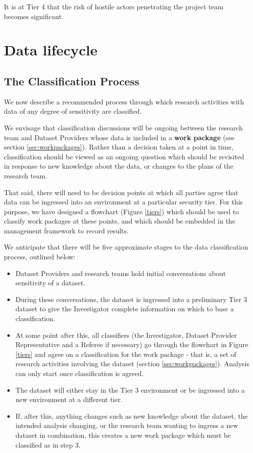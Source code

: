 \documentclass[10pt,a4paper,twocolumn]{article}
\begin{document}
It is at Tier 4 that the risk of hostile actors penetrating the project team becomes significant.

\section{Data lifecycle}

\subsection{The Classification Process}
\label{sec:classification}

We now describe a recommended process through which research activities with data of any degree of sensitivity are classified. 

We envisage that classification discussions will be ongoing between the research team and Dataset Providers whose data is included in a \textbf{work package} (see section \ref{sec:workpackages}). Rather than a decision taken at a point in time, classification should be viewed as an ongoing question which should be revisited in response to new knowledge about the data, or changes to the plans of the research team.

That said, there will need to be decision points at which all parties agree that data can be ingressed into an environment at a particular security tier. For this purpose, we have designed a flowchart (Figure \ref{tiers}) which should be used to classify work packages at these points, and which should be embedded in the management framework to record results.

We anticipate that there will be five approximate stages to the data classification process, outlined below:

\begin{itemize}
    \item Dataset Providers and research teams hold initial conversations about sensitivity of a dataset.
    \item During these conversations, the dataset is ingressed into a preliminary Tier 3 dataset to give the Investigator  complete information on which to base a classification.
    \item At some point after this,  all classifiers (the Investigator, Dataset Provider Representative and a Referee if necessary) go through the flowchart in Figure \ref{tiers} and agree on a classification for the work package - that is, a set of research activities involving the dataset (section \ref{sec:workpackages}). Analysis can only start once classification is agreed.
    \item The dataset will either stay in the Tier 3 environment or be ingressed into a new environment at a different tier.
    \item If, after this, anything changes such as new knowledge about the dataset, the intended analysis changing, or the research team wanting to ingress a new dataset in combination, this creates a new work package which must be classified as in step 3.
\end{itemize}
\end{document}
